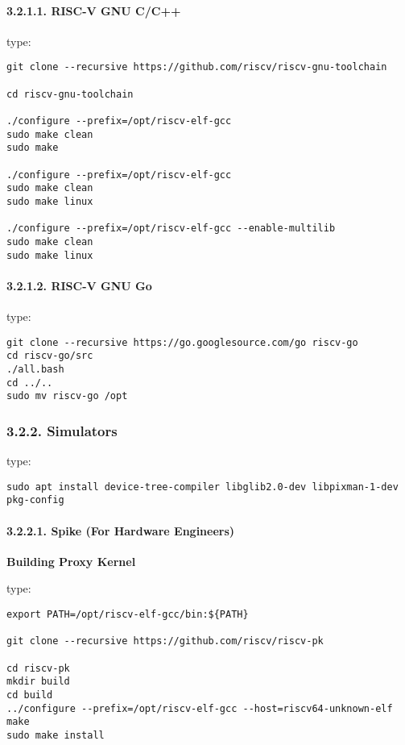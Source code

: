 \documentclass[]{article}
\let\oldparagraph\paragraph
\renewcommand{\paragraph}[1]{\oldparagraph{#1}\mbox{}}
\begin{document}
\hypertarget{risc-v-gnu-cc}{%
\paragraph{3.2.1.1. RISC-V GNU C/C++}\label{risc-v-gnu-cc}}

type:

\begin{verbatim}
git clone --recursive https://github.com/riscv/riscv-gnu-toolchain

cd riscv-gnu-toolchain

./configure --prefix=/opt/riscv-elf-gcc
sudo make clean
sudo make

./configure --prefix=/opt/riscv-elf-gcc
sudo make clean
sudo make linux

./configure --prefix=/opt/riscv-elf-gcc --enable-multilib
sudo make clean
sudo make linux
\end{verbatim}

\hypertarget{risc-v-gnu-go}{%
\paragraph{3.2.1.2. RISC-V GNU Go}\label{risc-v-gnu-go}}

type:

\begin{verbatim}
git clone --recursive https://go.googlesource.com/go riscv-go
cd riscv-go/src
./all.bash
cd ../..
sudo mv riscv-go /opt
\end{verbatim}

\hypertarget{simulators}{%
\subsubsection{3.2.2. Simulators}\label{simulators}}

type:

\begin{verbatim}
sudo apt install device-tree-compiler libglib2.0-dev libpixman-1-dev pkg-config
\end{verbatim}

\hypertarget{spike-for-hardware-engineers}{%
\paragraph{3.2.2.1. Spike (For Hardware
Engineers)}\label{spike-for-hardware-engineers}}

\textbf{Building Proxy Kernel}

type:

\begin{verbatim}
export PATH=/opt/riscv-elf-gcc/bin:${PATH}

git clone --recursive https://github.com/riscv/riscv-pk

cd riscv-pk
mkdir build
cd build
../configure --prefix=/opt/riscv-elf-gcc --host=riscv64-unknown-elf
make
sudo make install
\end{verbatim}
\end{document}
